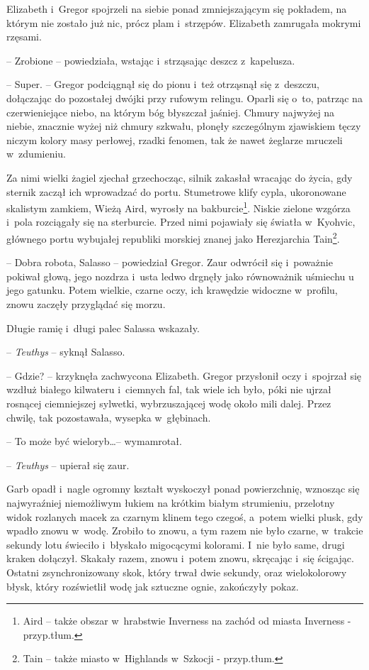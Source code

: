 \documentclass[oneside,polish,12pt,sfheadings]{mwbk}
\begin{document}
Elizabeth i~Gregor spojrzeli na siebie ponad zmniejszającym się pokładem,
na którym nie zostało już nic, prócz plam i~strzępów. Elizabeth zamrugała
mokrymi rzęsami.

-- Zrobione -- powiedziała, wstając i~strząsając deszcz z~kapelusza.

-- Super. -- Gregor podciągnął się do pionu i~też otrząsnął się z~deszczu,
dołączając do pozostałej dwójki przy rufowym relingu. Oparli się o~to,
patrząc na czerwieniejące niebo, na którym bóg błyszczał jaśniej. Chmury
najwyżej na niebie, znacznie wyżej niż chmury szkwału, płonęły
szczególnym zjawiskiem tęczy niczym kolory masy perłowej, rzadki
fenomen, tak że nawet żeglarze mruczeli w~zdumieniu.

Za nimi wielki żagiel zjechał grzechocząc, silnik zakasłał wracając do
życia, gdy sternik zaczął ich wprowadzać do portu. Stumetrowe klify
cypla, ukoronowane skalistym zamkiem, Wieżą Aird, wyrosły na
bakburcie\footnote{Aird -- także obszar w~hrabstwie
Inverness na zachód od miasta Inverness - przyp.tłum.}. Niskie zielone
wzgórza i~pola rozciągały się na sterburcie. Przed nimi pojawiały się
światła w~Kyohvic, głównego portu wybujałej republiki morskiej znanej
jako Herezjarchia Tain\footnote{Tain -- także miasto w~Highlands w~Szkocji - przyp.tłum.}.

-- Dobra robota, Salasso -- powiedział Gregor. Zaur odwrócił się i~poważnie pokiwał głową, jego nozdrza i~usta ledwo drgnęły jako
równoważnik uśmiechu u jego gatunku. Potem wielkie, czarne oczy, ich
krawędzie widoczne w~profilu, znowu zaczęły przyglądać się morzu.

Długie ramię i~długi palec Salassa wskazały.

-- \emph{Teuthys} -- syknął Salasso.

-- Gdzie? -- krzyknęła zachwycona Elizabeth. Gregor przysłonił oczy i~spojrzał się wzdłuż białego kilwateru i~ciemnych fal, tak wiele ich było,
póki nie ujrzał rosnącej ciemniejszej sylwetki, wybrzuszającej wodę
około mili dalej. Przez chwilę, tak pozostawała, wysepka w~głębinach.

-- To może być wieloryb\ldots -- wymamrotał.

-- \emph{Teuthys }-- upierał się zaur.

Garb opadł i~nagle ogromny kształt wyskoczył ponad powierzchnię,
wznosząc się najwyraźniej niemożliwym łukiem na krótkim białym
strumieniu, przelotny widok rozlanych macek za czarnym klinem tego
czegoś, a~potem wielki plusk, gdy wpadło znowu w~wodę. Zrobiło to znowu,
a tym razem nie było czarne, w~trakcie sekundy lotu świeciło i~błyskało
migocącymi kolorami. I~nie było same, drugi kraken dołączył. Skakały
razem, znowu i~potem znowu, skręcając i~się ścigając. Ostatni
zsynchronizowany skok, który trwał dwie sekundy, oraz wielokolorowy
błysk, który rozświetlił wodę jak sztuczne ognie, zakończyły pokaz.
\end{document}
